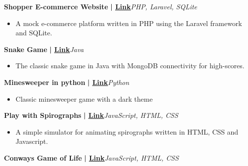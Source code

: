 \documentclass[a4paper]{article}
\begin{document}
        \vspace*{3mm}
      {\textbf{Shopper E-commerce Website}}\textbf{ | \href{https://github.com/syedhuzaif199/shopper}{\underline{Link}}}\hfill{\sl PHP, Laravel, SQLite}\\
          \vspace{-1mm}
\begin{itemize} \itemsep -3pt
\item[] A mock e-commerce platform written in PHP using the Laravel framework and SQLite.
\end{itemize}

          \vspace*{3mm}
      {\textbf{Snake Game}}\textbf{ | \href{https://github.com/syedhuzaif199/snake-mongo}{\underline{Link}}}\hfill{\sl Java}\\
          \vspace{-1mm}
\begin{itemize} \itemsep -3pt
\item[] The classic snake game in Java with MongoDB connectivity for high-scores.
\end{itemize}
          \vspace*{3mm}
      {\textbf{Minesweeper in python}}\textbf{ | \href{https://github.com/syedhuzaif199/minesweeper-python}{\underline{Link}}}\hfill{\sl Python}\\
          \vspace{-1mm}
\begin{itemize} \itemsep -3pt
\item[] Classic minesweeper game with a dark theme
\end{itemize}
          \vspace*{3mm}
      {\textbf{Play with Spirographs}}\textbf{ | \href{https://github.com/syedhuzaif199/play-with-spirographs}{\underline{Link}}}\hfill{\sl JavaScript, HTML, CSS}\\
          \vspace{-1mm}
\begin{itemize} \itemsep -3pt
\item[] A simple simulator for animating spirographs written in HTML, CSS and Javascript.
\end{itemize}
          \vspace*{3mm}
      {\textbf{Conway\textquotesingle{}s Game of Life}}\textbf{ | \href{https://github.com/syedhuzaif199/game-of-life}{\underline{Link}}}\hfill{\sl JavaScript, HTML, CSS}\\
          \vspace{-1mm}
\end{document}
